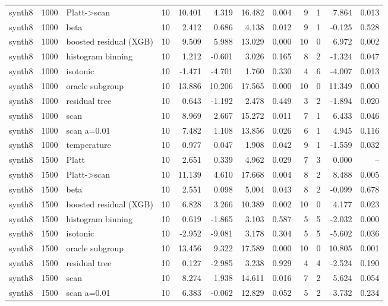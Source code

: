 \begin{tabular}{lllrrrrrrrrr}
synth8 & 1000 & Platt->scan & 10 & 10.401 & 4.319 & 16.482 & 0.004 & 9 & 1 & 7.864 & 0.013 \\
synth8 & 1000 & beta & 10 & 2.412 & 0.686 & 4.138 & 0.012 & 9 & 1 & -0.125 & 0.528 \\
synth8 & 1000 & boosted residual (XGB) & 10 & 9.509 & 5.988 & 13.029 & 0.000 & 10 & 0 & 6.972 & 0.002 \\
synth8 & 1000 & histogram binning & 10 & 1.212 & -0.601 & 3.026 & 0.165 & 8 & 2 & -1.324 & 0.047 \\
synth8 & 1000 & isotonic & 10 & -1.471 & -4.701 & 1.760 & 0.330 & 4 & 6 & -4.007 & 0.013 \\
synth8 & 1000 & oracle subgroup & 10 & 13.886 & 10.206 & 17.565 & 0.000 & 10 & 0 & 11.349 & 0.000 \\
synth8 & 1000 & residual tree & 10 & 0.643 & -1.192 & 2.478 & 0.449 & 3 & 2 & -1.894 & 0.020 \\
synth8 & 1000 & scan & 10 & 8.969 & 2.667 & 15.272 & 0.011 & 7 & 1 & 6.433 & 0.046 \\
synth8 & 1000 & scan a=0.01 & 10 & 7.482 & 1.108 & 13.856 & 0.026 & 6 & 1 & 4.945 & 0.116 \\
synth8 & 1000 & temperature & 10 & 0.977 & 0.047 & 1.908 & 0.042 & 9 & 1 & -1.559 & 0.032 \\
synth8 & 1500 & Platt & 10 & 2.651 & 0.339 & 4.962 & 0.029 & 7 & 3 & 0.000 & -- \\
synth8 & 1500 & Platt->scan & 10 & 11.139 & 4.610 & 17.668 & 0.004 & 8 & 2 & 8.488 & 0.005 \\
synth8 & 1500 & beta & 10 & 2.551 & 0.098 & 5.004 & 0.043 & 8 & 2 & -0.099 & 0.678 \\
synth8 & 1500 & boosted residual (XGB) & 10 & 6.828 & 3.266 & 10.389 & 0.002 & 10 & 0 & 4.177 & 0.023 \\
synth8 & 1500 & histogram binning & 10 & 0.619 & -1.865 & 3.103 & 0.587 & 5 & 5 & -2.032 & 0.000 \\
synth8 & 1500 & isotonic & 10 & -2.952 & -9.081 & 3.178 & 0.304 & 5 & 5 & -5.602 & 0.036 \\
synth8 & 1500 & oracle subgroup & 10 & 13.456 & 9.322 & 17.589 & 0.000 & 10 & 0 & 10.805 & 0.001 \\
synth8 & 1500 & residual tree & 10 & 0.127 & -2.985 & 3.238 & 0.929 & 4 & 4 & -2.524 & 0.190 \\
synth8 & 1500 & scan & 10 & 8.274 & 1.938 & 14.611 & 0.016 & 7 & 2 & 5.624 & 0.054 \\
synth8 & 1500 & scan a=0.01 & 10 & 6.383 & -0.062 & 12.829 & 0.052 & 5 & 2 & 3.732 & 0.234 \\

\end{tabular}
